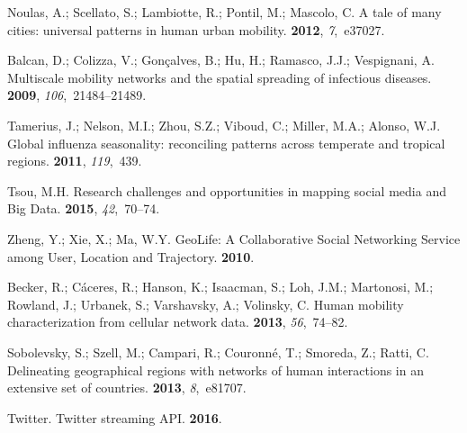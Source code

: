 \documentclass[ijgi,article,accept,moreauthors,pdftex,10pt,a4paper]{mdpi}
\theoremstyle{mdpi}
\newcounter{ex}
\newcounter{re}
\theoremstyle{mdpidefinition}
\begin{document}
\begin{thebibliography}{-------}
Noulas, A.; Scellato, S.; Lambiotte, R.; Pontil, M.; Mascolo, C.
\newblock A tale of many cities: universal patterns in human urban mobility.
 {\bf 2012}, {\em 7},~e37027.

Balcan, D.; Colizza, V.; Gon{\c{c}}alves, B.; Hu, H.; Ramasco, J.J.;
  Vespignani, A.
\newblock Multiscale mobility networks and the spatial spreading of infectious
  diseases.
 {\bf 2009},
  {\em 106},~21484--21489.

Tamerius, J.; Nelson, M.I.; Zhou, S.Z.; Viboud, C.; Miller, M.A.; Alonso, W.J.
\newblock Global influenza seasonality: reconciling patterns across temperate
  and tropical regions.
 {\bf 2011}, {\em 119},~439.

Tsou, M.H.
\newblock Research challenges and opportunities in mapping social media and Big
  Data.
 {\bf 2015}, {\em
  42},~70--74.

Zheng, Y.; Xie, X.; Ma, W.Y.
\newblock GeoLife: A Collaborative Social Networking Service among User,
  Location and Trajectory. {\bf 2010}.

Becker, R.; C{\'a}ceres, R.; Hanson, K.; Isaacman, S.; Loh, J.M.; Martonosi,
  M.; Rowland, J.; Urbanek, S.; Varshavsky, A.; Volinsky, C.
\newblock Human mobility characterization from cellular network data.
 {\bf 2013}, {\em 56},~74--82.

Sobolevsky, S.; Szell, M.; Campari, R.; Couronn{\'e}, T.; Smoreda, Z.; Ratti,
  C.
\newblock Delineating geographical regions with networks of human interactions
  in an extensive set of countries.
 {\bf 2013}, {\em 8},~e81707.

Twitter.
\newblock Twitter streaming API.
 {\bf
  2016}.


\end{thebibliography}
\end{document}
